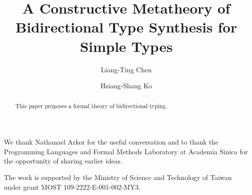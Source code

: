 \documentclass[acmsmall,screen]{acmart}
\theoremstyle{acmdefinition}
\begin{document}
\author{Liang-Ting Chen}
\author{Hsiang-Shang Ko}


\title{A Constructive Metatheory of Bidirectional Type Synthesis for Simple Types}

\begin{abstract}
  This paper proposes a formal theory of bidirectional typing.
\end{abstract}

\maketitle









\begin{acks}
We thank Nathanael Arkor for the useful conversation and to thank the Programming Languages and Formal Methods Laboratory at Academia Sinica for the opportunity of sharing earlier ideas.

The work is supported by the Ministry of Science and Technology of Taiwan under grant MOST 109-2222-E-001-002-MY3.
\end{acks}



\end{document}
